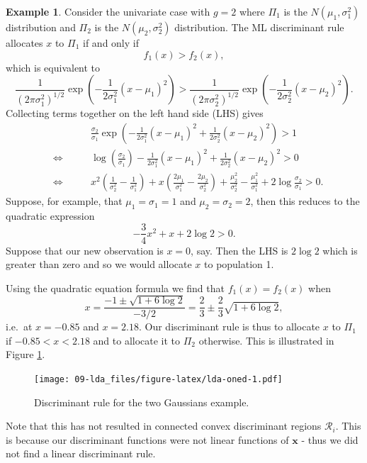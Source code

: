 \documentclass[
]{book}
\theoremstyle{definition}
\theoremstyle{definition}
\newtheorem{example}{Example}[chapter]
\theoremstyle{definition}
\theoremstyle{definition}
\theoremstyle{remark}
\begin{document}
\begin{example}
\protect\hypertarget{exm:exnine1}{}\label{exm:exnine1}Consider the univariate case with \(g=2\) where \(\Pi_1\) is the \(N(\mu_1,\sigma_1^2)\) distribution and \(\Pi_2\) is the \(N(\mu_2,\sigma_2^2)\) distribution. The ML discriminant rule allocates \(x\) to \(\Pi_1\) if and only if
\[
f_1(x) > f_2(x) ,
\]
which is equivalent to
\[
\frac{1}{(2\pi\sigma_1^2)^{1/2}} \exp \left(-\frac{1}{2\sigma_1^2} (x-\mu_1)^2 \right)
> \frac{1}{(2\pi\sigma_2^2)^{1/2}} \exp \left(-\frac{1}{2\sigma_2^2} (x-\mu_2)^2 \right).
\]
Collecting terms together on the left hand side (LHS) gives
\begin{eqnarray}
&&  \qquad \frac{\sigma_2}{\sigma_1} \exp \left(-\frac{1}{2\sigma_1^2} (x - \mu_1)^2 +\frac{1}{2\sigma_2^2} (x - \mu_2)^2 \right)> 1 \\
&\iff& \qquad \log \left(\frac{\sigma_2}{\sigma_1} \right)-\frac{1}{2\sigma_1^2} (x - \mu_1)^2 + \frac{1}{2\sigma_2^2} (x - \mu_2)^2 > 0 \\
& \iff & \qquad x^2 \left(\frac{1}{\sigma_2^2} - \frac{1}{\sigma_1^2} \right)
+ x \left(\frac{2 \mu_1}{\sigma_1^2} - \frac{2 \mu_2}{\sigma_2^2} \right)+ \frac{\mu_2^2}{\sigma_2^2} - \frac{\mu_1^2}{\sigma_1^2} + 2 \log \frac{\sigma_2}{\sigma_1} > 0. \label{eq:lda1d}
\end{eqnarray}
Suppose, for example, that \(\mu_1 = \sigma_1 = 1\) and \(\mu_2 = \sigma_2 = 2\), then this reduces to the quadratic expression
\[ -\frac{3}{4}x^2 + x + 2 \log 2 > 0.\]
Suppose that our new observation is \(x=0\), say. Then the LHS is \(2 \log 2\) which is greater than zero and so we would allocate \(x\) to population 1.

Using the quadratic equation formula we find that \(f_1(x)=f_2(x)\) when
\[x = \frac{-1 \pm \sqrt{1+6 \log 2}}{-3/2} = \frac{2}{3} \pm \frac{2}{3} \sqrt{1 + 6 \log 2},\] i.e.~at \(x = -0.85\) and \(x = 2.18\). Our discriminant rule is thus to allocate \(x\) to \(\Pi_1\) if \(-0.85 < x < 2.18\) and to allocate it to \(\Pi_2\) otherwise. This is illustrated in Figure \ref{fig:lda-oned}.
\end{example}

\begin{figure}
\centering
\texttt{[image: 09-lda\_files/figure-latex/lda-oned-1.pdf]}
\caption{\label{fig:lda-oned}Discriminant rule for the two Gaussians example.}
\end{figure}

Note that this has not resulted in connected convex discriminant regions \(\mathcal{R}_i\). This is because our discriminant functions were not linear functions of \(\mathbf x\) - thus we did not find a linear discriminant rule.
\end{document}
